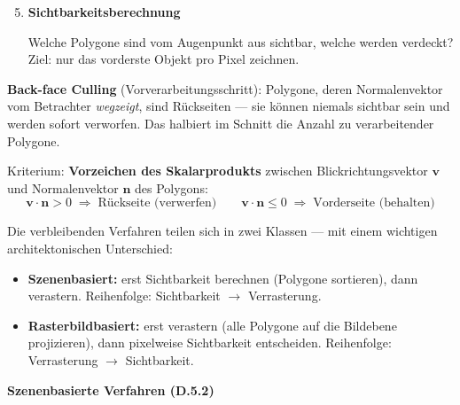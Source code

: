 \documentclass[12pt, a4paper]{article}
\begin{document}

\begin{enumerate}
  \setcounter{enumi}{4}

  \item \textbf{Sichtbarkeitsberechnung}

  Welche Polygone sind vom Augenpunkt aus sichtbar, welche werden verdeckt? Ziel: nur das vorderste Objekt pro Pixel zeichnen.

\end{enumerate}

\textbf{Back-face Culling} (Vorverarbeitungsschritt): Polygone, deren Normalenvektor vom Betrachter \textit{wegzeigt}, sind Rückseiten — sie können niemals sichtbar sein und werden sofort verworfen. Das halbiert im Schnitt die Anzahl zu verarbeitender Polygone.

Kriterium: \textbf{Vorzeichen des Skalarprodukts} zwischen Blickrichtungsvektor $\mathbf{v}$ und Normalenvektor $\mathbf{n}$ des Polygons:
\[
  \mathbf{v} \cdot \mathbf{n} > 0 \;\Rightarrow\; \text{Rückseite (verwerfen)}
  \qquad
  \mathbf{v} \cdot \mathbf{n} \leq 0 \;\Rightarrow\; \text{Vorderseite (behalten)}
\]

\medskip
Die verbleibenden Verfahren teilen sich in zwei Klassen — mit einem wichtigen architektonischen Unterschied:

\begin{itemize}
  \item \textbf{Szenenbasiert:} erst Sichtbarkeit berechnen (Polygone sortieren), dann verastern. Reihenfolge: Sichtbarkeit $\to$ Verrasterung.
  \item \textbf{Rasterbildbasiert:} erst verastern (alle Polygone auf die Bildebene projizieren), dann pixelweise Sichtbarkeit entscheiden. Reihenfolge: Verrasterung $\to$ Sichtbarkeit.
\end{itemize}

\textbf{Szenenbasierte Verfahren (D.5.2)}
\end{document}
